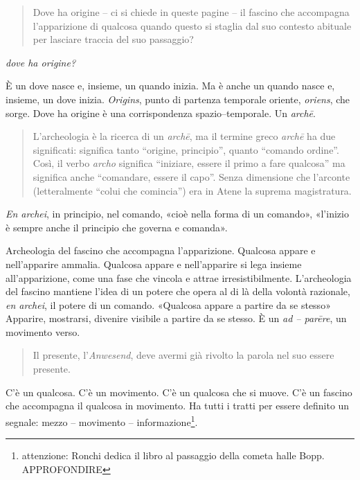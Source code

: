 \documentclass{../../lib/gs}
\begin{document}
\begin{quote}
\begin{sf}
\small
Dove ha origine – ci si chiede in queste pagine – il fascino che accompagna l'apparizione di qualcosa quando questo si staglia dal suo contesto abituale per lasciare traccia del suo passaggio?
\end{sf}
\end{quote}

\emph{dove ha origine?}

È un dove nasce e, insieme, un quando inizia. Ma è anche un quando nasce e, insieme, un dove inizia. \emph{Origins}, punto di partenza temporale oriente, \emph{oriens}, che sorge. Dove ha origine è una corrispondenza spazio–temporale. Un \emph{archē}.


\begin{quote}
\begin{sf}
\small
L'archeologia è la ricerca di un \emph{archē}, ma il termine greco \emph{archē} ha due significati: significa tanto “origine, principio”, quanto “comando ordine”. Così, il verbo \emph{archo} significa “iniziare, essere il primo a fare qualcosa” ma significa anche “comandare, essere il capo”. Senza dimensione che l'arconte (letteralmente “colui che comincia”) era in Atene la suprema magistratura. \cite{agamben17}
\end{sf}
\end{quote}

\emph{En archei}, in principio, nel comando, «cioè nella forma di un comando», «l'inizio è sempre anche il principio che governa e comanda».

Archeologia del fascino che accompagna l'apparizione. Qualcosa appare e nell'apparire ammalia. Qualcosa appare e nell'apparire si lega insieme all'apparizione, come una fase che vincola e attrae irresistibilmente. L'archeologia del fascino mantiene l'idea di un potere che opera al di là della volontà razionale, \emph{en archei}, il potere di un comando. «Qualcosa appare a partire da se stesso» \cite{agamben19} Apparire, mostrarsi, divenire visibile a partire da se stesso. È un \emph{ad – parēre}, un movimento verso.

\begin{quote}
\begin{sf}
\small
Il presente, l'\emph{Anwesend}, deve avermi già rivolto la parola nel suo essere presente. \cite{agamben19}
\end{sf}
\end{quote}

C'è un qualcosa. C'è un movimento. C'è un qualcosa che si muove. C'è un fascino che accompagna il qualcosa in movimento. Ha tutti i tratti per essere definito un segnale: mezzo – movimento – informazione\footnote{attenzione: Ronchi dedica il libro al passaggio della cometa halle Bopp. APPROFONDIRE}.
\end{document}
